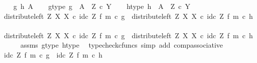 \begin{isabellebody}
\ \ \isamarkupfalse%
\ g\ h\ A\isanewline
\ \ \isamarkupfalse%
\ g{\isacharunderscore}{\kern0pt}type{\isacharcolon}{\kern0pt}\ {\isachardoublequoteopen}g\ {\isacharcolon}{\kern0pt}\ A\ {\isasymrightarrow}\ Z\ {\isasymtimes}\isactrlsub c\ Y{\isachardoublequoteclose}\isanewline
\ \ \isamarkupfalse%
\ h{\isacharunderscore}{\kern0pt}type{\isacharcolon}{\kern0pt}\ {\isachardoublequoteopen}h\ {\isacharcolon}{\kern0pt}\ A\ {\isasymrightarrow}\ Z\ {\isasymtimes}\isactrlsub c\ Y{\isachardoublequoteclose}\isanewline
\ \ \isamarkupfalse%
\ {\isachardoublequoteopen}{\isacharparenleft}{\kern0pt}distribute{\isacharunderscore}{\kern0pt}left\ Z\ X\ X\ {\isasymcirc}\isactrlsub c\ {\isacharparenleft}{\kern0pt}id\isactrlsub c\ Z\ {\isasymtimes}\isactrlsub f\ m{\isacharparenright}{\kern0pt}{\isacharparenright}{\kern0pt}\ {\isasymcirc}\isactrlsub c\ g\ {\isacharequal}{\kern0pt}\ {\isacharparenleft}{\kern0pt}distribute{\isacharunderscore}{\kern0pt}left\ Z\ X\ X\ {\isasymcirc}\isactrlsub c\ {\isacharparenleft}{\kern0pt}id\isactrlsub c\ Z\ {\isasymtimes}\isactrlsub f\ m{\isacharparenright}{\kern0pt}{\isacharparenright}{\kern0pt}\ {\isasymcirc}\isactrlsub c\ h{\isachardoublequoteclose}\isanewline
\ \ \isamarkupfalse%
\ \isamarkupfalse%
\ {\isachardoublequoteopen}distribute{\isacharunderscore}{\kern0pt}left\ Z\ X\ X\ {\isasymcirc}\isactrlsub c\ {\isacharparenleft}{\kern0pt}id\isactrlsub c\ Z\ {\isasymtimes}\isactrlsub f\ m{\isacharparenright}{\kern0pt}\ {\isasymcirc}\isactrlsub c\ g\ {\isacharequal}{\kern0pt}\ distribute{\isacharunderscore}{\kern0pt}left\ Z\ X\ X\ {\isasymcirc}\isactrlsub c\ {\isacharparenleft}{\kern0pt}id\isactrlsub c\ Z\ {\isasymtimes}\isactrlsub f\ m{\isacharparenright}{\kern0pt}\ {\isasymcirc}\isactrlsub c\ h{\isachardoublequoteclose}\isanewline
\ \ \ \ \isamarkupfalse%
\ assms\ g{\isacharunderscore}{\kern0pt}type\ h{\isacharunderscore}{\kern0pt}type\ \isamarkupfalse%
\ {\isacharparenleft}{\kern0pt}typecheck{\isacharunderscore}{\kern0pt}cfuncs{\isacharcomma}{\kern0pt}\ simp\ add{\isacharcolon}{\kern0pt}\ comp{\isacharunderscore}{\kern0pt}associative{}{\isacharparenright}{\kern0pt}\isanewline
\ \ \isamarkupfalse%
\ \isamarkupfalse%
\ {\isachardoublequoteopen}{\isacharparenleft}{\kern0pt}id\isactrlsub c\ Z\ {\isasymtimes}\isactrlsub f\ m{\isacharparenright}{\kern0pt}\ {\isasymcirc}\isactrlsub c\ g\ {\isacharequal}{\kern0pt}\ {\isacharparenleft}{\kern0pt}id\isactrlsub c\ Z\ {\isasymtimes}\isactrlsub f\ m{\isacharparenright}{\kern0pt}\ {\isasymcirc}\isactrlsub c\ h{\isachardoublequoteclose}\isanewline

\end{isabellebody}
